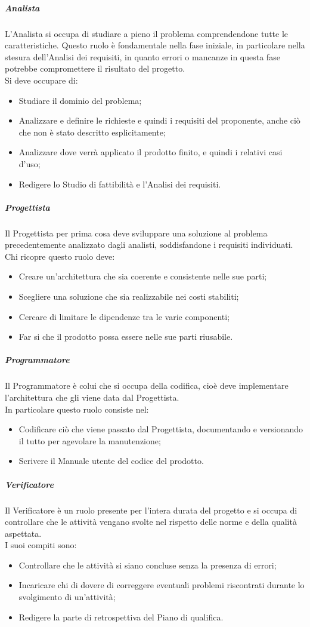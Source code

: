 \subparagraph{Analista}
L'Analista si occupa di studiare a pieno il problema comprendendone tutte le caratteristiche. Questo ruolo è fondamentale nella fase iniziale, in particolare nella stesura dell'Analisi dei requisiti, in quanto errori o mancanze in questa fase potrebbe compromettere il risultato del progetto.\\
Si deve occupare di:
\begin{itemize}
    \item Studiare il dominio del problema;
    \item Analizzare e definire le richieste e quindi i requisiti del proponente, anche ciò che non è stato descritto esplicitamente;
    \item Analizzare dove verrà applicato il prodotto finito, e quindi i relativi casi d'uso;
    \item Redigere lo Studio di fattibilità e l'Analisi dei requisiti.
\end{itemize}

\subparagraph{Progettista}
Il Progettista per prima cosa deve sviluppare una soluzione al problema precedentemente analizzato dagli analisti, soddisfandone i requisiti individuati.\\
Chi ricopre questo ruolo deve:
\begin{itemize}
    \item Creare un'architettura che sia coerente e consistente nelle sue parti;
    \item Scegliere una soluzione che sia realizzabile nei costi stabiliti;
    \item Cercare di limitare le dipendenze tra le varie componenti;
    \item Far si che il prodotto possa essere nelle sue parti riusabile.
\end{itemize}

\subparagraph{Programmatore}
Il Programmatore è colui che si occupa della codifica, cioè deve implementare l'architettura che gli viene data dal Progettista.\\
In particolare questo ruolo consiste nel:
\begin{itemize}
    \item Codificare ciò che viene passato dal Progettista, documentando e versionando il tutto per agevolare la manutenzione;
    \item Scrivere il Manuale utente del codice del prodotto.
\end{itemize}

\subparagraph{Verificatore}
Il Verificatore è un ruolo presente per l'intera durata del progetto e si occupa di controllare che le attività vengano svolte nel rispetto delle norme e della qualità aspettata.\\
I suoi compiti sono:
\begin{itemize}
    \item Controllare che le attività si siano concluse senza la presenza di errori;
    \item Incaricare chi di dovere di correggere eventuali problemi riscontrati durante lo svolgimento di un'attività;
    \item Redigere la parte di retrospettiva del Piano di qualifica.
\end{itemize}

